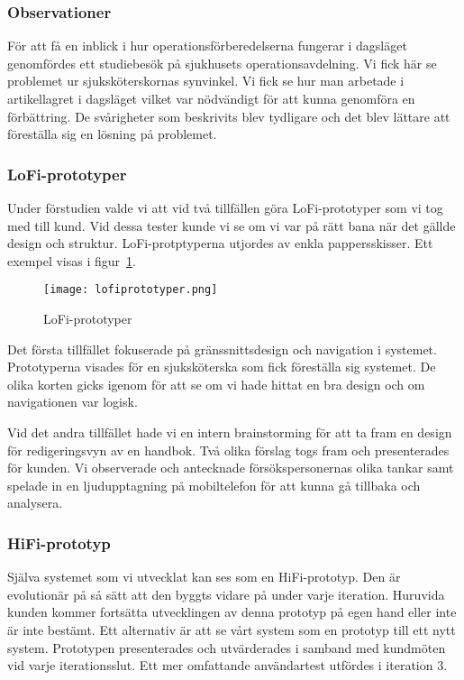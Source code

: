 
\subsubsection{Observationer}
För att få en inblick i hur operationsförberedelserna fungerar i dagsläget genomfördes ett studiebesök på sjukhusets operationsavdelning. Vi fick här se problemet ur sjuksköterskornas synvinkel. Vi fick se hur man arbetade i artikellagret i dagsläget vilket var nödvändigt för att kunna genomföra en förbättring. De svårigheter som beskrivits blev tydligare och det blev lättare att föreställa sig en lösning på problemet.

\subsubsection{LoFi-prototyper}
Under förstudien valde vi att vid två tillfällen göra LoFi-prototyper som vi tog med till kund. Vid dessa tester kunde vi se om vi var på rätt bana när det gällde design och struktur. LoFi-protptyperna utjordes av enkla pappersskisser. Ett exempel visas i figur~\ref{fig:lofiprototyper}.
\begin{figure}[htbp]
\begin{center}
\texttt{[image: lofiprototyper.png]}
\caption{LoFi-prototyper}
\label{fig:lofiprototyper}
\end{center}
\end{figure}
Det första tillfället fokuserade på gränssnittsdesign och navigation i systemet. Prototyperna visades för en sjuksköterska som fick föreställa sig systemet. De olika korten gicks igenom för att se om vi hade hittat en bra design och om navigationen var logisk.

Vid det andra tillfället hade vi en intern brainstorming för att ta fram en design för redigeringsvyn av en handbok. Två olika förslag togs fram och presenterades för kunden. Vi observerade och antecknade försökspersonernas olika tankar samt spelade in en ljudupptagning på mobiltelefon för att kunna gå tillbaka och analysera.
\subsubsection{HiFi-prototyp}
Själva systemet som vi utvecklat kan ses som en HiFi-prototyp. Den är evolutionär på så sätt att den byggts vidare på under varje iteration. Huruvida kunden kommer fortsätta utvecklingen av denna prototyp på egen hand eller inte är inte bestämt. Ett alternativ är att se vårt system som en prototyp till ett nytt system. 
Prototypen presenterades och utvärderades i samband med kundmöten vid varje iterationsslut. Ett mer omfattande användartest utfördes i iteration 3.


